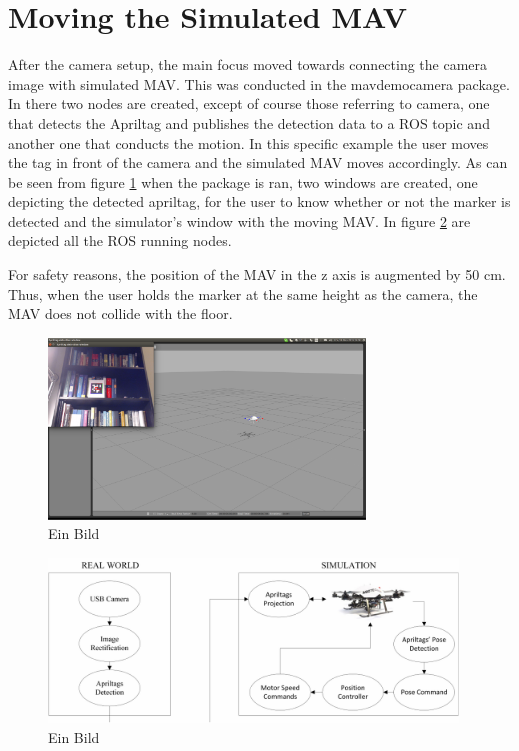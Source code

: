 \section{Moving the Simulated MAV}
\label{sec:movingMAV}
After the camera setup, the main focus moved towards connecting the camera image with simulated MAV. This was conducted in the mav\textunderscore demo\textunderscore camera package. In there two nodes are created, except of course those referring to camera, one that detects the Apriltag and publishes the detection data to a ROS topic and another one that conducts the motion. In this specific example the user moves the tag in front of the camera and the simulated MAV moves accordingly. As can be seen from figure \ref{pics:mav_demo_camera} when the package is ran, two windows are created, one depicting the detected apriltag, for the user to know whether or not the marker is detected and the simulator's window with the moving MAV. In figure \ref{pics:mav_demo_camera_rosgraph} are depicted all the ROS running nodes. 

For safety reasons, the position of the MAV in the z axis is augmented by 50 cm. 
Thus, when the user holds the marker at the same height as the camera, the MAV does not collide with the floor.

\begin{figure}
   \centering
   \includegraphics[width=0.75\textwidth]{images/mav_demo_camera.pdf}
   \caption{Ein Bild}
   \label{pics:mav_demo_camera}
\end{figure}

\begin{figure}
   \centering
   \includegraphics[width=0.97\textwidth]{images/cam_firefly_sim.pdf}
   \caption{Ein Bild}
   \label{pics:mav_demo_camera_rosgraph}
\end{figure}

